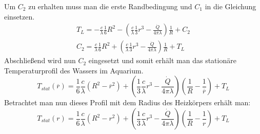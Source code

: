 \newpage
\noindent
Um $C_2$ zu erhalten muss man die erste Randbedingung und $C_1$ in die Gleichung einsetzen.
\begin{align*}	
T_L = - \frac{c}{\lambda}\frac{1}{6} R^2 - \left(\frac{c}{\lambda}\frac{1}{3} r^3 - \frac{\dot{Q}}{4\pi\lambda}\right)\frac{1}{R} + C_2 \\
C_2 = \frac{c}{\lambda}\frac{1}{6} R^2 + \left(\frac{c}{\lambda}\frac{1}{3} r^3 - \frac{\dot{Q}}{4\pi\lambda}\right)\frac{1}{R} + T_L
\end{align*}
Abschließend wird nun $C_2$ eingesetzt und somit erhält man das stationäre Temperaturprofil des  Wassers im Aquarium. 
\[
	T_{stat}(\overline{r}) = \frac{1}{6}\frac{c}{\lambda}\left(R^2 - \overline{r}^2\right) + \left(\frac{1}{3}\frac{c}{\lambda} r^3 - \frac{\dot{Q}}{4\pi\lambda}\right)\left(\frac{1}{R} - \frac{1}{\overline{r}}\right) + T_L
\]
Betrachtet man nun dieses Profil mit dem Radius des Heizkörpers erhält man:
\[
	T_{stat}(r) = \frac{1}{6}\frac{c}{\lambda}\left(R^2 - r^2\right) + \left(\frac{1}{3}\frac{c}{\lambda} r^3 - \frac{\dot{Q}}{4\pi\lambda}\right)\left(\frac{1}{R} - \frac{1}{r}\right) + T_L
\]
